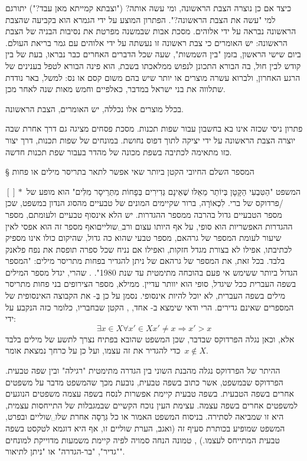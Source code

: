 כיצד אם כן נוצרה הצבת הראשונה, ומי עשה אותה? ("וצבתא קמייתא מאן עבד?") יתורגם
למי "עשה את הצבת הראשונה?". הפתרון המוצע על ידי הגמרא הוא בקביעה שהצבת הראשונה
נבראה על ידי אלוהים. מסכת אבות שבמשנה מפרטת את נסיבות הבניה של הצבת הראשונה: יש
האומרים כי צבת ראשונה זו נעשתה על ידי אלוהים עם גמר בריאת העולם. ביום שישי
הראשון, בזמן "בין השמשות", שעה שכל הדברים האחרים כבר נבראו, בעת של בין קודש לבין
חול, בה הבורא התכונן לנפוש ממלאכתו בשבת, הוא פינה הבורא לטפל בענינים
של הרגע האחרון, ולברוא עשרה מוצרים או יותר שיש בהם משום קסם או נס: למשל, באר
נודדת שתלווה את בני ישראל במדבר, כאלפיים וחמש מאות שנה לאחר מכן.

בכלל מוצרים אלו נכללה, יש האומרים, הצבת הראשונה.

פתרון ניסי שכזה אינו בא בחשבון עבור שפות תכנות. מסכת פסחים מציגה גם דרך אחרת
שבה יוצרה הצבת הראשונה על ידי יציקה לתוך דפוס נחושת. במונחים של שפות תכנות, דרך
יצור כזו מתאימה לכתיבה בשפת מכונה של מהדר בעבור שפת תכנות חדשה.

§ המספר השלם החיובי הקטן ביותר שאי אפשר לתאר בתריסר מילים או פחות

המשפט "הַטִּבְעִי הַקָּטָן בְּיוֹתֵר מֵאֵלּו שֶׁאֵינָם גְּדִירִים בְּפָחוֹת מִתְּרֵיסָר מִלִּים" הוא מופע של
{\([^{}]*\)}/פרדוקס של ברי. לִכְאוֹרָה, ברור שקיימים המונים של טבעיים מהסוג הנדון במשפט, שכן
מספר הטבעיים גדול בהרבה ממספר ההגדרות. יש הלא אינסוף טבעיים ולעומתם, מספר
ההגדרות האפשריות הוא סופי, על אף היותו עצום ורב␣שוליים{ואף מספר זה הוא
אפסי לאין שיעור לעומת המספר של גרהאם, מספר טבעי שהוא כה גדול, שהיקום כולו אינו
מספיק לכתיבתו, אפילו לא בצורת מגדל חזקות, ואפילו אם נניח שכל ספרה תופסת את נפח
פלאנק בלבד. בכל זאת, את המספר של גרהאם של ניתן להגדיר בפחות מתריסר מילים:
"המספר הגדול ביותר ששימש אי פעם בהוכחה מתימטית עד שנת 1980". }. שהרי, יגדל
מספר המילים בשפה העברית ככל שיגדל, סופי הוא יוותר עדיין. ממילא, מספר הצירופים
בני פחות מתריסר מילים בשפה העברית, לא יוכל להיות אינסופי.
נסמן על כן בְּ- את הקבוצה האינסופית של המספרים שאינם גדירים. הרי ודאי שימצא
ב- אחד, , הקטן שבחבריו, כלומר כזה  הנקבע על ידי: \[
 ∃
x∈X\mbox{}∀ x'∈X\mbox{}x'≠x\mbox{}⇒ x'>x
\] אלא, וכאן נגלה הפרדוקס שבדבר, שכן המשפט שהובא בפתיח נצרך לתשע של מילים בלבד
      כדי להגדיר את  זה עצמו, ועל כן על כרחך נמצאת אומר~$x∉ X$.

ההיתר של הפרדוקס נגלה מהבנת השוני בין הגדרה מתימטית "רגילה" ובין שפה טבעית.
הפרדוקס שבמשפט, אשר כתוב בשפה טבעית, נובעת מכך שהמשפט מדבר על משפטים אחרים בשפה
הטבעית. בשפה טבעית קיימת אפשרות לנסח בשפה עצמה משפטים הנוגעים למשפטים אחרים
בשפה עצמה. עצימת העין נוכח הקשיים שבמגבלות של התייחסות עצמית, היא זו שמביאה
לסתירה. בניסוח המשפט האמור או כל גִּרְסָה אחרת שלו␣שוליים{ ובפרט, המשפט
  שמופיע בכותרת סעיף זה (ואגב, הערת שוליים זו, אף היא דוגמא לטקסט בשפה טבעית
  המתייחס לעצמו.)
}, טמונה הנחה סמויה לפיה קיימת משמעות מדוייקת למונחים "גדיר", "בר-הגדרה" או "ניתן לתיאור".


